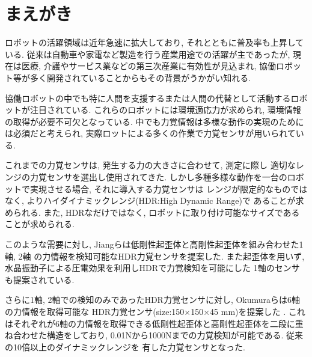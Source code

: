 \section{まえがき} 
ロボットの活躍領域は近年急速に拡大しており, 
それとともに普及率も上昇している. 
従来は自動車や家電など製造を行う産業用途での活躍が主であったが, 
現在は医療, 介護やサービス業などの第三次産業に有効性が見込まれ, 
協働ロボット等が多く開発されていることからもその背景がうかがい知れる.

協働ロボットの中でも特に人間を支援するまたは人間の代替として活動するロボットが注目されている. 
これらのロボットには環境適応力が求められ, 環境情報の取得が必要不可欠となっている.
中でも力覚情報は多様な動作の実現のためには必須だと考えられ, 
実際ロットによる多くの作業で力覚センサが用いられている\cite{denso}\cite{asimo}\cite{ROBEAR}.

これまでの力覚センサは, 発生する力の大きさに合わせて, 測定に際し
適切なレンジの力覚センサを選出し使用されてきた. 
しかし多種多様な動作を一台のロボットで実現させる場合, それに導入する力覚センサは
レンジが限定的なものではなく, よりハイダイナミックレンジ(HDR:High Dynamic Range)で
あることが求められる. 
また, HDRなだけではなく, ロボットに取り付け可能なサイズであることが求められる. 

このような需要に対し, Jiangらは低剛性起歪体と高剛性起歪体を組み合わせた1軸\cite{Jiang2015}, 2軸\cite{jiang2013}
の力情報を検知可能なHDR力覚センサを提案した. 
また起歪体を用いず, 水晶振動子による圧電効果を利用しHDRで力覚検知を可能にした
1軸のセンサも提案されている\cite{murozaki2014miniaturized}.

さらに1軸, 2軸での検知のみであったHDR力覚センサに対し, Okumuraらは6軸の力情報を取得可能な
HDR力覚センサ(size:150×150×45 mm)を提案した\cite{okumura2018high} \cite{Okumura}. 
これはそれぞれが6軸の力情報を取得できる低剛性起歪体と高剛性起歪体を二段に重ね合わせた構造をしており, 
0.01Nから1000Nまでの力覚検知が可能である. 従来の10倍以上のダイナミックレンジを
有した力覚センサとなった. 



